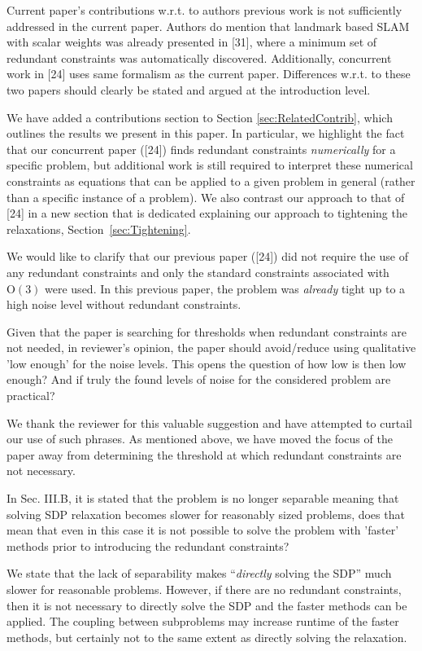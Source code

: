 Current paper's contributions w.r.t. to authors previous work is not sufficiently addressed in the current paper. Authors do mention that landmark based SLAM with scalar weights was already presented in [31], where a minimum set of redundant  constraints was automatically discovered. Additionally,  concurrent work in [24] uses same formalism as the current paper. Differences w.r.t. to these two papers should clearly be stated and argued at the introduction level. 
\begin{response}
    We have added a contributions section to Section \ref{sec:RelatedContrib}, which outlines the results we present in this paper. In particular, we highlight the fact that our concurrent paper ([24]) finds redundant constraints \emph{numerically} for a specific problem, but additional work is still required to interpret these numerical constraints as equations that can be applied to a given problem in general (rather than a specific instance of a problem). We also contrast our approach to that of [24] in a new section that is dedicated explaining our approach to tightening the relaxations, Section~\ref{sec:Tightening}.
    
    We would like to clarify that our previous paper ([24]) did not require the use of any redundant constraints and only the standard constraints associated with $\mbox{O}(3)$ were used. In this previous paper, the problem was \emph{already} tight up to a high noise level without redundant constraints.
\end{response}

Given that the paper is searching for thresholds when redundant constraints are not needed, in reviewer's opinion, the paper should avoid/reduce using qualitative 'low enough' for the noise levels. This opens the question of how low is then low enough? And if truly the found levels of noise for the 
considered problem are practical? 
\begin{response}
    We thank the reviewer for this valuable suggestion and have attempted to curtail our use of such phrases. As mentioned above, we have moved the focus of the paper away from determining the threshold at which redundant constraints are not necessary.
\end{response}

In Sec. III.B, it is stated that the problem is no longer separable meaning that solving SDP relaxation becomes slower for reasonably sized problems, does that mean that even in this case it is not possible to solve the problem with 'faster' methods prior to introducing the redundant constraints? 
\begin{response}
    We state that the lack of separability makes ``\emph{directly} solving the SDP'' much slower for reasonable problems. However, if there are no redundant constraints, then it is not necessary to directly solve the SDP and the faster methods can be applied. The coupling between subproblems may increase runtime of the faster methods, but certainly not to the same extent as directly solving the relaxation.
\end{response}

